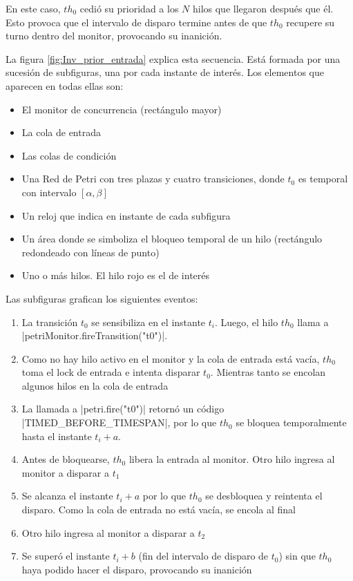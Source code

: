 En este caso, $th_{0}$ cedió su prioridad a los $N$ hilos que llegaron después
que él. Esto provoca que el intervalo de disparo termine antes de que $th_{0}$
recupere su turno dentro del monitor, provocando su inanición.

La figura \ref{fig:Inv_prior_entrada} explica esta secuencia. Está formada por
una sucesión de subfiguras, una por cada instante de interés. Los elementos que
aparecen en todas ellas son:
\begin{itemize}
    \item El monitor de concurrencia (rectángulo mayor)
    \item La cola de entrada
    \item Las colas de condición
    \item Una Red de Petri con tres plazas y cuatro transiciones, donde $t_{0}$
    es temporal con intervalo $[\alpha,\beta]$
    \item Un reloj que indica en instante de cada subfigura
    \item Un área donde se simboliza el bloqueo temporal de un hilo (rectángulo
    redondeado con líneas de punto)
    \item Uno o más hilos. El hilo rojo es el de interés
\end{itemize}

Las subfiguras grafican los siguientes eventos:
\begin{enumerate}[label=\alph*)]
    \item La transición $t_{0}$ se sensibiliza en el instante $t_{i}$. Luego, el
    hilo $th_{0}$ llama a |petriMonitor.fireTransition("t0")|. 
    \item Como no hay hilo activo en el monitor y la cola de entrada está vacía,
    $th_{0}$ toma el lock de entrada e intenta disparar $t_{0}$. Mientras tanto
    se encolan algunos hilos en la cola de entrada
    \item La llamada a |petri.fire("t0")| retornó un código
    |TIMED_BEFORE_TIMESPAN|, por lo que $th_{0}$ se bloquea
    temporalmente hasta el instante $t_{i}+a$.
    \item Antes de bloquearse, $th_{0}$ libera la entrada al monitor. Otro hilo
    ingresa al monitor a disparar a $t_{1}$
    \item Se alcanza el instante $t_{i}+a$ por lo que $th_{0}$ se desbloquea y
    reintenta el disparo. Como la cola de entrada no está vacía, se encola al
    final
    \item Otro hilo ingresa al monitor a disparar a $t_{2}$
    \item Se superó el instante $t_{i}+b$ (fin del intervalo de disparo de
    $t_{0}$) sin que $th_{0}$ haya podido hacer el disparo, provocando su
    inanición
\end{enumerate}


